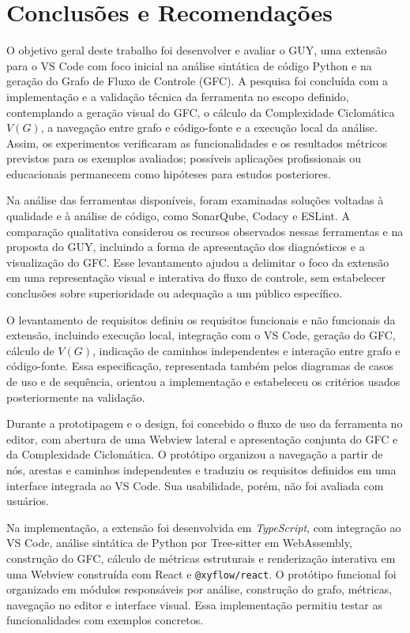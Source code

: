 \chapter{Conclusões e Recomendações}
\label{cap:05}
\label{cap:conclusoes}

O objetivo geral deste trabalho foi desenvolver e avaliar o GUY, uma extensão para o VS Code com foco inicial na análise sintática de código Python e na geração do Grafo de Fluxo de Controle (GFC). A pesquisa foi concluída com a implementação e a validação técnica da ferramenta no escopo definido, contemplando a geração visual do GFC, o cálculo da Complexidade Ciclomática \(V(G)\), a navegação entre grafo e código-fonte e a execução local da análise. Assim, os experimentos verificaram as funcionalidades e os resultados métricos previstos para os exemplos avaliados; possíveis aplicações profissionais ou educacionais permanecem como hipóteses para estudos posteriores.

Na análise das ferramentas disponíveis, foram examinadas soluções voltadas à qualidade e à análise de código, como SonarQube, Codacy e ESLint. A comparação qualitativa considerou os recursos observados nessas ferramentas e na proposta do GUY, incluindo a forma de apresentação dos diagnósticos e a visualização do GFC. Esse levantamento ajudou a delimitar o foco da extensão em uma representação visual e interativa do fluxo de controle, sem estabelecer conclusões sobre superioridade ou adequação a um público específico.

O levantamento de requisitos definiu os requisitos funcionais e não funcionais da extensão, incluindo execução local, integração com o VS Code, geração do GFC, cálculo de \(V(G)\), indicação de caminhos independentes e interação entre grafo e código-fonte. Essa especificação, representada também pelos diagramas de casos de uso e de sequência, orientou a implementação e estabeleceu os critérios usados posteriormente na validação.

Durante a prototipagem e o design, foi concebido o fluxo de uso da ferramenta no editor, com abertura de uma Webview lateral e apresentação conjunta do GFC e da Complexidade Ciclomática. O protótipo organizou a navegação a partir de nós, arestas e caminhos independentes e traduziu os requisitos definidos em uma interface integrada ao VS Code. Sua usabilidade, porém, não foi avaliada com usuários.

Na implementação, a extensão foi desenvolvida em \textit{TypeScript}, com integração ao VS Code, análise sintática de Python por Tree-sitter em WebAssembly, construção do GFC, cálculo de métricas estruturais e renderização interativa em uma Webview construída com React e \texttt{@xyflow/react}. O protótipo funcional foi organizado em módulos responsáveis por análise, construção do grafo, métricas, navegação no editor e interface visual. Essa implementação permitiu testar as funcionalidades com exemplos concretos.

